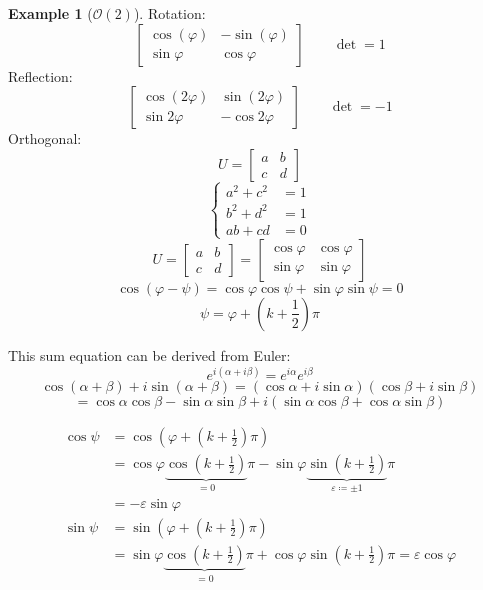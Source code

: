 \documentclass[a4paper,landscape,twocolumn]{article}
\theoremstyle{definition}
\newtheorem{ex}{Example}
\begin{document}
\begin{ex}[$\mathcal O(2)$]
  Rotation:
  \[ \begin{bmatrix} \cos(\varphi) & -\sin(\varphi) \\ \sin{\varphi} & \cos{\varphi} \end{bmatrix} \qquad \det = 1 \]
  Reflection:
  \[ \begin{bmatrix} \cos(2\varphi) & \sin(2\varphi) \\ \sin{2\varphi} & -\cos{2\varphi} \end{bmatrix} \qquad \det = -1 \]
  Orthogonal:
  \[ U = \begin{bmatrix} a & b \\ c & d \end{bmatrix} \]
  \[
    \begin{cases}
      a^2 + c^2 &= 1 \\
      b^2 + d^2 &= 1 \\
      ab + cd   &= 0
    \end{cases}
  \]
  \[ U = \begin{bmatrix} a & b \\ c & d \end{bmatrix} = \begin{bmatrix} \cos{\varphi} & \cos{\varphi} \\ \sin{\varphi} & \sin{\varphi} \end{bmatrix} \]
  \[ \cos(\varphi - \psi) = \cos{\varphi} \cos{\psi} + \sin{\varphi} \sin{\psi} = 0 \]
  \[ \psi = \varphi + (k + \frac12) \pi \]

  This sum equation can be derived from Euler:
  \[ e^{i (\alpha + i \beta)} = e^{i\alpha} e^{i\beta} \]
  \[ \cos(\alpha + \beta) + i \sin(\alpha + \beta) = (\cos{\alpha} + i \sin{\alpha})(\cos{\beta} + i \sin{\beta}) \]
  \[ = \cos{\alpha} \cos{\beta} - \sin{\alpha} \sin{\beta} + i (\sin{\alpha} \cos{\beta} + \cos{\alpha} \sin{\beta}) \]

  \begin{align*}
    \cos{\psi} &= \cos(\varphi + (k + \frac12) \pi) \\
      &= \cos{\varphi} \underbrace{\cos(k + \frac12)}_{=0} \pi - \sin{\varphi} \underbrace{\sin(k + \frac12)}_{\varepsilon \coloneqq \pm 1} \pi \\
      &= -\varepsilon \sin{\varphi} \\
    \sin{\psi} &= \sin(\varphi + (k + \frac12) \pi) \\
      &= \sin{\varphi} \underbrace{\cos(k + \frac12)}_{=0} \pi + \cos\varphi \sin(k + \frac12) \pi = \varepsilon \cos{\varphi}
  \end{align*}
\end{ex}
\end{document}
